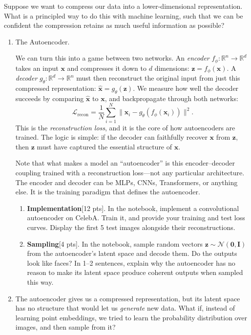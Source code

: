 \documentclass[submit]{harvardml}
\begin{document}
\begin{problem}
Suppose we want to compress our data into a lower-dimensional representation. What is a principled way to do this with machine learning, such that we can be confident the compression retains as much useful information as possible?

\begin{enumerate}
        \item The Autoencoder. 
        
We can turn this into a game between two networks. An \textit{encoder} $f_\phi : \mathbb R^n \to \mathbb R^d$ takes an input $\mathbf x$ and compresses it down to $d$ dimensions: $\mathbf z = f_\phi(\mathbf x)$. A \textit{decoder} $g_\theta : \mathbb R^d \to \mathbb R^n$ must then reconstruct the original input from just this compressed representation: $\hat{\mathbf x} = g_\theta(\mathbf z)$. We measure how well the decoder succeeds by comparing $\hat{\mathbf x}$ to $\mathbf x$, and backpropagate through both networks:
\[
  \mathcal{L}_{\mathrm{recon}} = \frac{1}{N}\sum_{i=1}^{N} \|\mathbf x_i - g_\theta(f_\phi(\mathbf x_i))\|^2.
\]
This is the \textit{reconstruction loss}, and it is the core of how autoencoders are trained. The logic is simple: if the decoder can faithfully recover $\mathbf x$ from $\mathbf z$, then $\mathbf z$ must have captured the essential structure of $\mathbf x$.

Note that what makes a model an ``autoencoder'' is this encoder--decoder coupling trained with a reconstruction loss---not any particular architecture. The encoder and decoder can be MLPs, CNNs, Transformers, or anything else. It is the training paradigm that defines the autoencoder.

\begin{enumerate}

\item \textbf{Implementation}[12 pts]. In the notebook, implement a convolutional autoencoder on CelebA. Train it, and provide your training and test loss curves. Display the first 5 test images alongside their reconstructions.

\item \textbf{Sampling}[4 pts]. In the notebook, sample random vectors $\mathbf z \sim \mathcal{N}(\bm{0}, \mathbf{I})$ from the autoencoder's latent space and decode them. Do the outputs look like faces? In 1--2 sentences, explain why the autoencoder has no reason to make its latent space produce coherent outputs when sampled this way.
\end{enumerate}
\item The autoencoder gives us a compressed representation, but its latent space has no structure that would let us \textit{generate} new data. What if, instead of learning point embeddings, we tried to learn the probability distribution over images, and then sample from it?


\end{enumerate}
\end{problem}
\end{document}
